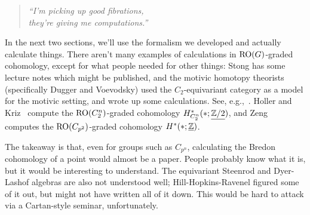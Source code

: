 \begin{quote}\textit{
	``I'm picking up good fibrations,\\
	they're giving me computations.''
}\end{quote}
\label{const_comp}

In the next two sections, we'll use the formalism we developed and actually calculate things. There aren't many
examples of calculations in $\mathrm{RO}(G)$-graded cohomology, except for what people needed for other things: Stong has
some lecture notes which might be published, and the motivic homotopy theorists (specifically Dugger and Voevodsky)
used the $C_2$-equivariant category as a model for the motivic setting, and wrote up some calculations. See,
e.g.,~\cite{Lew88, Dug15}. Holler and Kriz~\cite{HollerKriz} compute the $\mathrm{RO}(C_2^n)$-graded cohomology
$H_{C_2^n}^*(*; \underline{\mathbb Z/2})$, and Zeng~\cite{Zeng17} computes the $\mathrm{RO}(C_{p^2})$-graded cohomology
$H^*(*;\underline{\mathbb Z})$.

The takeaway is that, even for groups such as $C_{p^n}$, calculating the Bredon cohomology of a point would almost
be a paper. People probably know what it is, but it would be interesting to understand. The equivariant Steenrod
and Dyer-Lashof algebras are also not understood well; Hill-Hopkins-Ravenel figured some of it out, but might not
have written all of it down. This would be hard to attack via a Cartan-style seminar, unfortunately.

